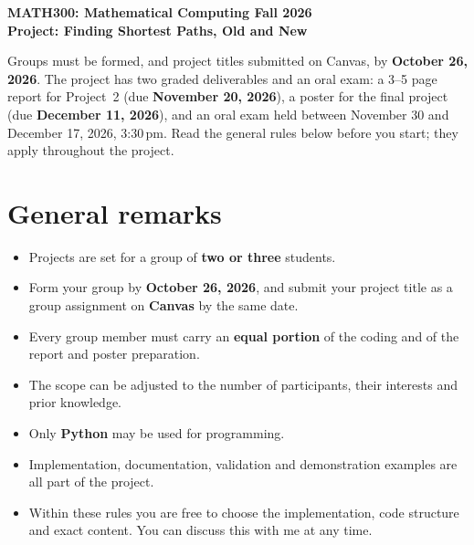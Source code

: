 \documentclass[11pt,a4paper]{article}
\begin{document}
\begin{center}
  {\large\bfseries MATH300: Mathematical Computing \textperiodcentered{} Fall 2026}\\[6pt]
  {\Large\bfseries Project: Finding Shortest Paths, Old and New}
\end{center}
\vspace{6pt}

Groups must be formed, and project titles submitted on Canvas, by
\textbf{October 26, 2026}. The project
has two graded deliverables and an oral exam: a 3--5 page report for
Project~2 (due \textbf{November 20, 2026}), a poster for the final project
(due \textbf{December 11, 2026}), and an oral exam held between November 30
and December 17, 2026, 3:30\,pm. Read the general rules below before you
start; they apply throughout the project.

\section*{General remarks}
\begin{itemize}
  \item Projects are set for a group of \textbf{two or three} students.
  \item Form your group by \textbf{October 26, 2026}, and submit your
        project title as a group assignment on \textbf{Canvas} by the same
        date.
  \item Every group member must carry an \textbf{equal portion} of the coding
        and of the report and poster preparation.
  \item The scope can be adjusted to the number of participants, their
        interests and prior knowledge.
  \item Only \textbf{Python} may be used for programming.
  \item Implementation, documentation, validation and demonstration examples
        are all part of the project.
  \item Within these rules you are free to choose the implementation, code
        structure and exact content. You can discuss this with me at any time.
\end{itemize}
\end{document}
